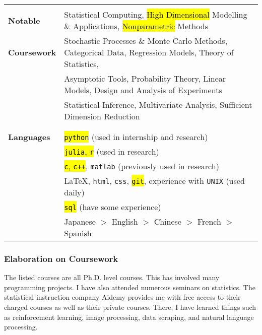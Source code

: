 \documentclass[utf8,letterpaper,oneside]{article}
\begin{document}
\begin{center}
\begin{tabular}{l l}
                           &                                                                                                               \\
  \textbf{Notable}         & Statistical Computing, \hl{High Dimensional} Modelling \& Applications, \hl{Nonparametric} Methods            \\
  \textbf{Coursework}      & Stochastic Processes \& Monte Carlo Methods, Categorical Data, Regression Models, Theory of Statistics,       \\
                           & Asymptotic Tools, Probability Theory, Linear Models, Design and Analysis of Experiments                       \\
                           & Statistical Inference, Multivariate Analysis, Sufficient Dimension Reduction                                  \\
                           &                                                                                                               \\ \hline
                           &                                                                                                               \\
  \textbf{Languages}       & \hl{\texttt{python}} (used in internship and research)                                                        \\
                           & \hl{\texttt{julia}, \texttt{r}} (used in research)                                                            \\
                           & \hl{\texttt{c}, \texttt{c++}}, \texttt{matlab} (previously used in research)                                  \\
                           & \LaTeX, \texttt{html}, \texttt{css}, \hl{\texttt{git}}, experience with \texttt{UNIX} (used daily)            \\
                           & \hl{\texttt{sql}} (have some experience)                                                                      \\
                           & Japanese $>$ English $>$ Chinese $>$ French $>$ Spanish                                                       \\
 \end{tabular}
\end{center}
\newpage
\large
\subsubsection*{Elaboration on Coursework}
The listed courses are all Ph.D. level courses. This has involved many programming projects. I have also attended numerous seminars on statistics. The statistical instruction company Aidemy provides me with free access to their charged courses as well as their private courses. There, I have learned things such as reinforcement learning, image processing, data scraping, and natural language processing.
\end{document}
